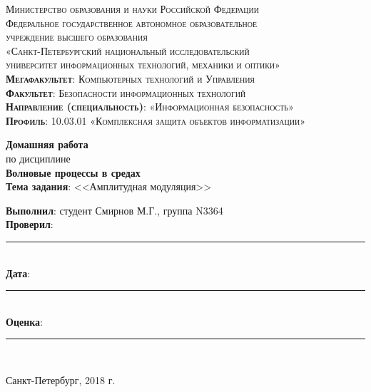 \begin{titlepage}
	\begin{center}
		\textsc{
			\fontsize{12pt}{14pt}\selectfont
			Министерство образования и науки Российской Федерации\\
			Федеральное государственное автономное образовательное\\
			учреждение высшего образования\\
			«Санкт-Петербургский национальный исследовательский\\
			университет информационных технологий, механики и оптики»\\
			\textbf{Мегафакультет}:  Компьютерных технологий и Управления\\
			\textbf{Факультет}: Безопасности информационных технологий\\
			\textbf{Направление (специальность)}: «Информационная безопасность»\\
			\textbf{Профиль}: 10.03.01 «Комплексная защита объектов информатизации»}
		
		\vfill
		
		\textbf{Домашняя работа}\\
		по дисциплине\\
		\textbf{Волновые процессы в средах}\\
	\vfill
	\textbf{Тема задания}: <<Амплитудная модуляция>>\\
	\end{center}

	\vfill
	
	\begin{flushright}
	\textbf{Выполнил}: студент Смирнов М.Г., группа N3364\\
	\textbf{Проверил}: \rule{10em}{.1pt}\\
		\vfill
	\textbf{Дата}: \rule{10em}{.1pt}\\
	\textbf{Оценка}: \rule{10em}{.1pt}\\

	\vfill
	


	\end{flushright}
	\vfill
	\begin{center}
		Санкт-Петербург, 2018 г.
	\end{center}
\end{titlepage}